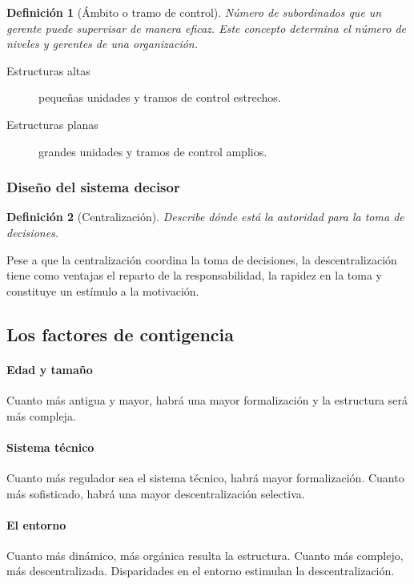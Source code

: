 \documentclass[12pt]{article}
\theoremstyle{definition_wo_parentheses}
\newtheorem{definicion}{Definición}[section]
\begin{document}
\begin{definicion}[Ámbito o tramo de control] Número de subordinados que un gerente puede supervisar de manera eficaz. Este concepto determina el número de niveles y gerentes de una organización.
\end{definicion}

\begin{description}
\item [Estructuras altas] pequeñas unidades y tramos de control estrechos.
\item [Estructuras planas] grandes unidades y tramos de control amplios.
\end{description}


\subsubsection{Diseño del sistema decisor}

\begin{definicion}[Centralización] 

	Describe dónde está la autoridad para la toma de decisiones.
	
\end{definicion}

	Pese a que la centralización coordina la toma de decisiones, la descentralización tiene como ventajas el reparto de la responsabilidad, la rapidez en la toma y constituye un estímulo a la motivación.
	
\subsection{Los factores de contigencia}

\paragraph{Edad y tamaño} Cuanto más antigua y mayor, habrá una mayor formalización y la estructura será más compleja.

\paragraph{Sistema técnico} Cuanto más regulador sea el sistema técnico, habrá mayor formalización. Cuanto más sofisticado, habrá una mayor descentralización selectiva.

\paragraph{El entorno} Cuanto más dinámico, más orgánica resulta la estructura. Cuanto más complejo, más descentralizada. Disparidades en el entorno estimulan la descentralización.
\end{document}
